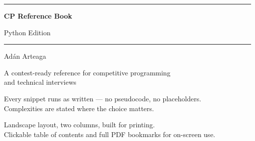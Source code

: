 \documentclass[10pt]{article}
\begin{document}

\begin{titlepage}
    \centering
    \vspace*{1.6cm}

    {\color{accent}\rule{\linewidth}{2.5pt}}
    \vspace{0.7cm}

    {\Huge\bfseries\color{accent} CP Reference Book\par}
    \vspace{0.5cm}
    {\LARGE Python Edition\par}

    \vspace{0.5cm}
    {\color{accent}\rule{\linewidth}{2.5pt}}

    \vspace{1.4cm}
    {\Large Adán Arteaga\par}

    \vspace{1.4cm}
    {\large A contest-ready reference for competitive programming\\
    and technical interviews\par}

    \vspace{0.9cm}
    {\normalsize\color{cmt}
    Every snippet runs as written --- no pseudocode, no placeholders.\\
    Complexities are stated where the choice matters.\par}

    \vfill
    {\footnotesize\color{cmt}Landscape layout, two columns, built for printing.\\
    Clickable table of contents and full PDF bookmarks for on-screen use.\par}
\end{titlepage}

\thispagestyle{plain}
\tableofcontents
\newpage
{}

\end{document}
